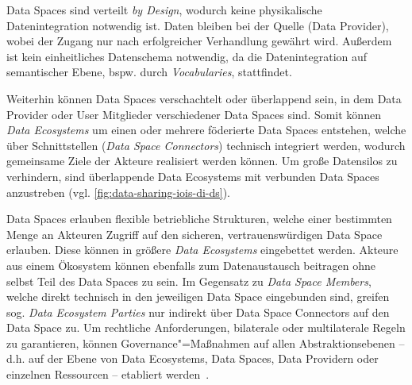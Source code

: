 Data Spaces sind verteilt \emph{by Design}, wodurch keine physikalische Datenintegration notwendig ist.
Daten bleiben bei der Quelle (Data Provider), wobei der Zugang nur nach erfolgreicher Verhandlung gewährt wird.
Außerdem ist kein einheitliches Datenschema notwendig, da die Datenintegration auf semantischer Ebene, bspw. durch \emph{Vocabularies}, stattfindet.

Weiterhin können Data Spaces verschachtelt oder überlappend sein, in dem Data Provider oder User Mitglieder verschiedener Data Spaces sind.
Somit können \emph{Data Ecosystems} um einen oder mehrere föderierte Data Spaces entstehen, welche über Schnittstellen (\emph{Data Space Connectors}) technisch integriert werden, wodurch gemeinsame Ziele der Akteure realisiert werden können.
Um große Datensilos zu verhindern, sind überlappende Data Ecosystems mit verbunden Data Spaces anzustreben (vgl. \autoref{fig:data-sharing-iois-di-ds}).

Data Spaces erlauben flexible betriebliche Strukturen, welche einer bestimmten Menge an Akteuren Zugriff auf den sicheren, vertrauenswürdigen Data Space erlauben.
Diese können in größere \emph{Data Ecosystems} eingebettet werden.
Akteure aus einem Ökosystem können ebenfalls zum Datenaustausch beitragen ohne selbst Teil des Data Spaces zu sein.
Im Gegensatz zu \emph{Data Space Members}, welche direkt technisch in den jeweiligen Data Space eingebunden sind, greifen sog. \emph{Data Ecosystem Parties} nur indirekt über Data Space Connectors auf den Data Space zu.
Um rechtliche Anforderungen, bilaterale oder multilaterale Regeln zu garantieren, können Governance"=Maßnahmen auf allen Abstraktionsebenen -- d.h. auf der Ebene von Data Ecosystems, Data Spaces, Data Providern oder einzelnen Ressourcen -- etabliert werden~\cite{mollerIndustrialDataEcosystems2024}.
